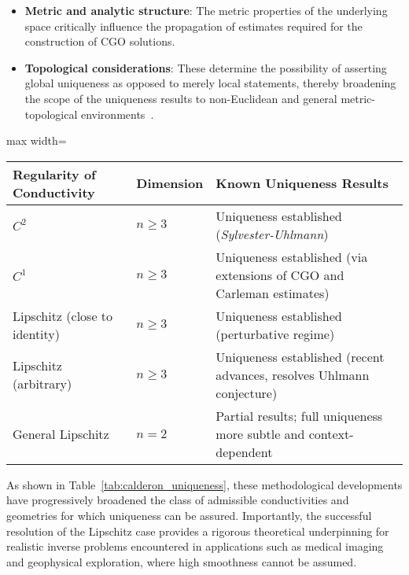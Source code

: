 \documentclass[sigconf]{acmart}
\begin{document}
\begin{itemize}
    \item \textbf{Metric and analytic structure}: The metric properties of the underlying space critically influence the propagation of estimates required for the construction of CGO solutions.
    \item \textbf{Topological considerations}: These determine the possibility of asserting global uniqueness as opposed to merely local statements, thereby broadening the scope of the uniqueness results to non-Euclidean and general metric-topological environments~\cite{ref102}.
\end{itemize}

\begin{table*}[htbp]
\centering
\caption{Summary of uniqueness results for Calderón's problem under varying conductivity regularity and spatial dimension.}
\label{tab:calderon_uniqueness}
\begin{adjustbox}{max width=\textwidth}
\begin{tabular}{lll}
\toprule
\textbf{Regularity of Conductivity} & \textbf{Dimension} & \textbf{Known Uniqueness Results} \\
\midrule
$C^2$ & $n \geq 3$ & Uniqueness established (\textit{Sylvester-Uhlmann}) \\
$C^1$ & $n \geq 3$ & Uniqueness established (via extensions of CGO and Carleman estimates) \\
Lipschitz (close to identity) & $n \geq 3$ & Uniqueness established (perturbative regime) \\
Lipschitz (arbitrary) & $n \geq 3$ & Uniqueness established (recent advances, resolves Uhlmann conjecture) \\
General Lipschitz & $n = 2$ & Partial results; full uniqueness more subtle and context-dependent \\
\bottomrule
\end{tabular}
\end{adjustbox}
\end{table*}

As shown in Table~\ref{tab:calderon_uniqueness}, these methodological developments have progressively broadened the class of admissible conductivities and geometries for which uniqueness can be assured. Importantly, the successful resolution of the Lipschitz case provides a rigorous theoretical underpinning for realistic inverse problems encountered in applications such as medical imaging and geophysical exploration, where high smoothness cannot be assumed.
\end{document}

